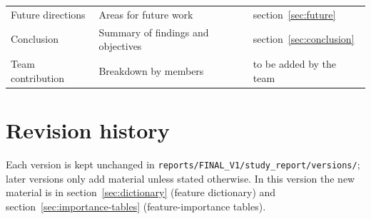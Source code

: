 \documentclass[11pt,a4paper]{article}
\begin{document}
\begin{center}
\begin{longtable}{>{\raggedright\arraybackslash}p{3.91cm}>{\raggedright\arraybackslash}p{8.40cm}>{\raggedright\arraybackslash}p{2.93cm}}
\hspace{0pt}Future directions & \hspace{0pt}Areas for future work & \hspace{0pt}section~\ref{sec:future}\\
\hspace{0pt}Conclusion & \hspace{0pt}Summary of findings and objectives & \hspace{0pt}section~\ref{sec:conclusion}\\
\hspace{0pt}Team contribution & \hspace{0pt}Breakdown by members & \hspace{0pt}to be added by the team\\
\end{longtable}\end{center}
\section*{Revision history}
Each version is kept unchanged in \texttt{reports/FINAL\_\allowbreak{}V1/study\_\allowbreak{}report/versions/}; later versions only add material unless stated otherwise. In this version the new material is in section~\ref{sec:dictionary} (feature dictionary) and section~\ref{sec:importance-tables} (feature-importance tables).
\end{document}
